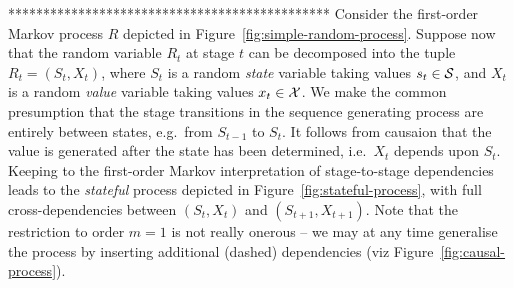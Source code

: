 \documentclass[a4paper]{article}
\begin{document}
**********************************************
Consider the first-order Markov process $R$ depicted in Figure~\ref{fig:simple-random-process}.
Suppose now that the random variable $R_t$ at stage $t$ can be decomposed into the tuple
$R_t=(S_t,X_t)$, where $S_t$ is a random {\em state} variable taking values $s_t\in{\cal S}$, and $X_t$
is a random {\em value} variable taking values $x_t\in{\cal X}$.
We make the common presumption that the stage transitions in the sequence generating process are entirely between states, e.g.\ from $S_{t-1}$ to $S_t$.
It follows from causaion that the value is generated after the state has been determined, i.e.\ $X_t$ depends upon $S_t$.
Keeping to the first-order Markov interpretation of stage-to-stage dependencies leads to
the {\em stateful} process depicted in Figure~\ref{fig:stateful-process}, with full cross-dependencies between $(S_t,X_t)$ and
$(S_{t+1},X_{t+1})$. Note that the restriction to order $m=1$ is not really onerous --  we may at any time generalise the process by inserting additional (dashed) dependencies
(viz Figure~\ref{fig:causal-process}).
\end{document}
